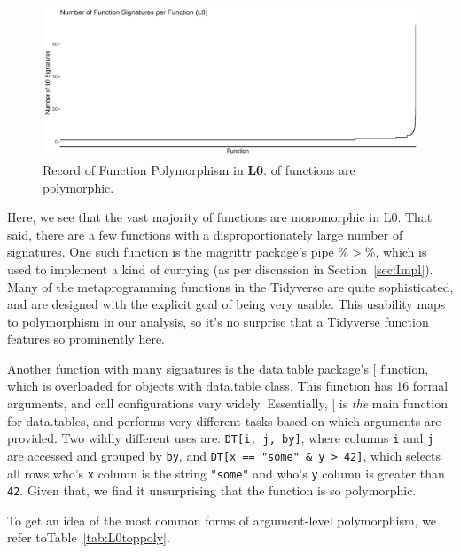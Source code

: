 \documentclass[acmsmall,10pt,review,anonymous]{acmart}\settopmatter{printfolios=true,printccs=false,printacmref=false}
\newcommand{\code}[1]{\lstinline|#1|\xspace}
\begin{document}
\begin{figure}[htbp]\begin{center}
\includegraphics[width=.9\textwidth]{L0_by_fun}
\caption{Record of Function Polymorphism in {\bf L0}. \LZEROPERCPOLY of functions are polymorphic.}
\label{fig:L0funcounts}\end{center}
\end{figure}

Here, we see that the vast majority of functions are monomorphic in L0.
That said, there are a few functions with a disproportionately large number of signatures.
One such function is the magrittr package's pipe \%$>$\%, which is used to implement a kind of currying (as per discussion in Section~\ref{sec:Impl}).
Many of the metaprogramming functions in the Tidyverse are quite sophisticated, and are designed with the explicit goal of being very usable.
This usability maps to polymorphism in our analysis, so it's no surprise that a Tidyverse function features so prominently here.

Another function with many signatures is the data.table package's [ function, which is overloaded for objects with data.table class.
This function has 16 formal arguments, and call configurations vary widely.
Essentially, [ is {\it the} main function for data.tables, and performs very different tasks based on which arguments are provided.
Two wildly different uses are:
\code{DT[i, j, by]}, where columns \code{i} and \code{j} are accessed and grouped by \code{by}, and \code{DT[x == "some" & y > 42]}, which selects all rows who's \code{x} column is the string \code{"some"} and who's \code{y} column is greater than \code{42}.
Given that, we find it unsurprising that the function is so polymorphic.

To get an idea of the most common forms of argument-level polymorphism, we refer toTable~\ref{tab:L0toppoly}.
\end{document}
